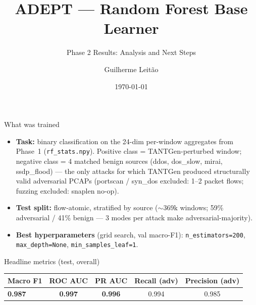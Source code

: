 \documentclass[10pt,aspectratio=169]{beamer}
\title[ADEPT --- RF Results]{ADEPT --- Random Forest Base Learner}
\subtitle{Phase 2 Results: Analysis and Next Steps}
\author{Guilherme Leit\~ao}
\institute[IST/INESC-ID]{Master Thesis --- IST / INESC-ID}
\date{\today}
\newcommand{\good}[1]{\textcolor{good}{\textbf{#1}}}
\begin{document}
\begin{frame}
  \titlepage
\end{frame}

\begin{frame}{What was trained}
\begin{itemize}
  \item \textbf{Task:} binary classification on the 24-dim per-window aggregates from Phase~1
  (\texttt{rf\_stats.npy}). Positive class = TANTGen-perturbed window;
  negative class = 4 matched benign sources (ddos, dos\_slow, mirai, ssdp\_flood) ---
  the only attacks for which TANTGen produced structurally valid adversarial PCAPs
  (portscan / syn\_dos excluded: 1--2 packet flows; fuzzing excluded: snaplen no-op).
  \item \textbf{Test split:} flow-atomic, stratified by source ($\sim$369k windows;
  59\% adversarial / 41\% benign --- 3 modes per attack make adversarial-majority).
  \item \textbf{Best hyperparameters} (grid search, val macro-F1):
  \texttt{n\_estimators=200}, \texttt{max\_depth=None}, \texttt{min\_samples\_leaf=1}.
\end{itemize}

\begin{block}{Headline metrics (test, overall)}
\centering
\begin{tabular}{lcccc}
\toprule
\textbf{Macro F1} & \textbf{ROC AUC} & \textbf{PR AUC} & \textbf{Recall (adv)} & \textbf{Precision (adv)} \\
\midrule
\good{0.987} & \good{0.997} & \good{0.996} & 0.994 & 0.985 \\
\bottomrule
\end{tabular}
\end{block}
\end{frame}
\end{document}
